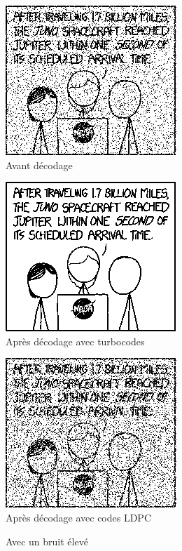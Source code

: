 \documentclass[12pt]{article}
\begin{document}
\begin{figure}
	\begin{minipage}{\textwidth}
		\begin{minipage}{.3\textwidth}
			\centering
			\includegraphics[scale=0.4]{turbo_noisy_80}\\
			Avant d\'ecodage
		\end{minipage}
		\begin{minipage}{.3\textwidth}
			\centering
			\includegraphics[scale=0.4]{turbo_decoded_80}\\
			Apr\`es d\'ecodage avec turbocodes
		\end{minipage}
		\begin{minipage}{.3\textwidth}
			\centering
			\includegraphics[scale=0.4]{ldpc_basic_decoded_80}\\
			Apr\`es d\'ecodage avec codes LDPC
		\end{minipage}
	\end{minipage}
	\caption{Avec un bruit \'elev\'e}
	\label{fig:eleve}
\end{figure}
\end{document}
